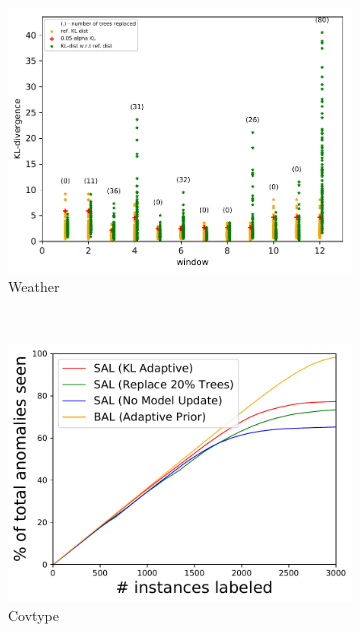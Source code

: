 \documentclass{article} %
\begin{document}
\begin{figure}
	\begin{subfigure}[b]{0.3\textwidth}
		\includegraphics[width=\textwidth]{figures/test_concept_drift_weather}
		\caption{Weather}
		\label{fig:concept_drift_weather_}
	\end{subfigure} \\
    \begin{subfigure}[b]{0.3\textwidth}
    	\includegraphics[width=\textwidth]{figures/num_seen-covtype}
    	\caption{Covtype}
    	\label{fig:concept_drift_covtype_num}
    \end{subfigure}
    \begin{subfigure}[b]{0.3\textwidth}

\end{subfigure}
\end{figure}
\end{document}
